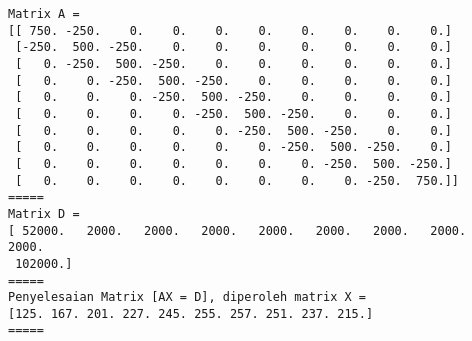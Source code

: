 \documentclass[11pt]{article}
\begin{document}
    \begin{Verbatim}[commandchars=\\\{\}]
Matrix A = 
[[ 750. -250.    0.    0.    0.    0.    0.    0.    0.    0.]
 [-250.  500. -250.    0.    0.    0.    0.    0.    0.    0.]
 [   0. -250.  500. -250.    0.    0.    0.    0.    0.    0.]
 [   0.    0. -250.  500. -250.    0.    0.    0.    0.    0.]
 [   0.    0.    0. -250.  500. -250.    0.    0.    0.    0.]
 [   0.    0.    0.    0. -250.  500. -250.    0.    0.    0.]
 [   0.    0.    0.    0.    0. -250.  500. -250.    0.    0.]
 [   0.    0.    0.    0.    0.    0. -250.  500. -250.    0.]
 [   0.    0.    0.    0.    0.    0.    0. -250.  500. -250.]
 [   0.    0.    0.    0.    0.    0.    0.    0. -250.  750.]]
=====
Matrix D = 
[ 52000.   2000.   2000.   2000.   2000.   2000.   2000.   2000.   2000.
 102000.]
=====
Penyelesaian Matrix [AX = D], diperoleh matrix X = 
[125. 167. 201. 227. 245. 255. 257. 251. 237. 215.]
=====

    \end{Verbatim}
\end{document}
